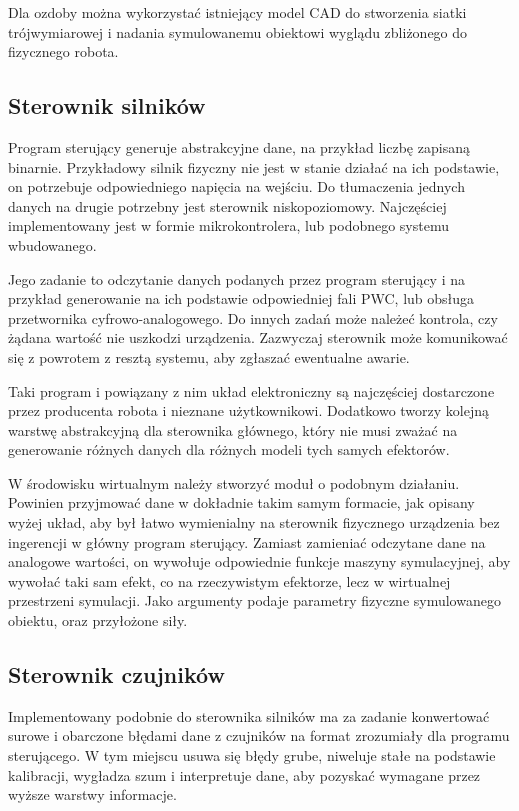 	Dla ozdoby można wykorzystać istniejący model CAD do stworzenia siatki trójwymiarowej i nadania symulowanemu obiektowi wyglądu zbliżonego do fizycznego robota.

	\subsection{Sterownik silników}
	Program sterujący generuje abstrakcyjne dane, na przykład liczbę zapisaną binarnie.
	Przykładowy silnik fizyczny nie jest w stanie działać na ich podstawie, on potrzebuje odpowiedniego napięcia na wejściu.
	Do tłumaczenia jednych danych na drugie potrzebny jest sterownik niskopoziomowy.
	Najczęściej implementowany jest w formie mikrokontrolera, lub podobnego systemu wbudowanego.

	Jego zadanie to odczytanie danych podanych przez program sterujący i na przykład generowanie na ich podstawie odpowiedniej fali PWC, lub obsługa przetwornika cyfrowo-analogowego.
	Do innych zadań może należeć kontrola, czy żądana wartość nie uszkodzi urządzenia.
	Zazwyczaj sterownik może komunikować się z powrotem z resztą systemu, aby zgłaszać ewentualne awarie.

	Taki program i powiązany z nim układ elektroniczny są najczęściej dostarczone przez producenta robota i nieznane użytkownikowi.
	Dodatkowo tworzy kolejną warstwę abstrakcyjną dla sterownika głównego, który nie musi zważać na generowanie różnych danych dla różnych modeli tych samych efektorów.
	
	W środowisku wirtualnym należy stworzyć moduł o podobnym działaniu.
	Powinien przyjmować dane w dokładnie takim samym formacie, jak opisany wyżej układ, aby był łatwo wymienialny na sterownik fizycznego urządzenia bez ingerencji w główny program sterujący.
	Zamiast zamieniać odczytane dane na analogowe wartości, on wywołuje odpowiednie funkcje maszyny symulacyjnej, aby wywołać taki sam efekt, co na rzeczywistym efektorze, lecz w wirtualnej przestrzeni symulacji.
	Jako argumenty podaje parametry fizyczne symulowanego obiektu, oraz przyłożone siły.
	

	\subsection{Sterownik czujników}
	Implementowany podobnie do sterownika silników ma za zadanie konwertować surowe i obarczone błędami dane z czujników na format zrozumiały dla programu sterującego.
	W tym miejscu usuwa się błędy grube, niweluje stałe na podstawie kalibracji, wygładza szum i interpretuje dane, aby pozyskać wymagane przez wyższe warstwy informacje.

